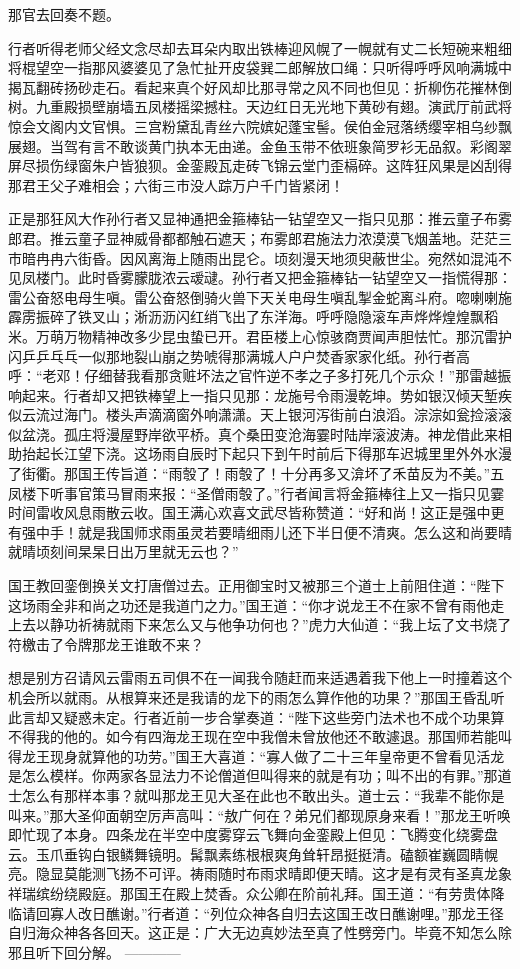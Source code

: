 \documentclass[12pt,UTF8]{ctexbook}
\begin{document}
那官去回奏不题。

行者听得老师父经文念尽却去耳朵内取出铁棒迎风幌了一幌就有丈二长短碗来粗细将棍望空一指那风婆婆见了急忙扯开皮袋巽二郎解放口绳：只听得呼呼风响满城中揭瓦翻砖扬砂走石。看起来真个好风却比那寻常之风不同也但见：折柳伤花摧林倒树。九重殿损壁崩墙五凤楼摇梁撼柱。天边红日无光地下黄砂有翅。演武厅前武将惊会文阁内文官惧。三宫粉黛乱青丝六院嫔妃蓬宝髻。侯伯金冠落绣缨宰相乌纱飘展翅。当驾有言不敢谈黄门执本无由递。金鱼玉带不依班象简罗衫无品叙。彩阁翠屏尽损伤绿窗朱户皆狼狈。金銮殿瓦走砖飞锦云堂门歪槅碎。这阵狂风果是凶刮得那君王父子难相会；六街三市没人踪万户千门皆紧闭！

正是那狂风大作孙行者又显神通把金箍棒钻一钻望空又一指只见那：推云童子布雾郎君。推云童子显神威骨都都触石遮天；布雾郎君施法力浓漠漠飞烟盖地。茫茫三市暗冉冉六街昏。因风离海上随雨出昆仑。顷刻漫天地须臾蔽世尘。宛然如混沌不见凤楼门。此时昏雾朦胧浓云叆叇。孙行者又把金箍棒钻一钻望空又一指慌得那：雷公奋怒电母生嗔。雷公奋怒倒骑火兽下天关电母生嗔乱掣金蛇离斗府。唿喇喇施霹雳振碎了铁叉山；淅沥沥闪红绡飞出了东洋海。呼呼隐隐滚车声烨烨煌煌飘稻米。万萌万物精神改多少昆虫蛰已开。君臣楼上心惊骇商贾闻声胆怯忙。那沉雷护闪乒乒乓乓一似那地裂山崩之势唬得那满城人户户焚香家家化纸。孙行者高呼：“老邓！仔细替我看那贪赃坏法之官忤逆不孝之子多打死几个示众！”那雷越振响起来。行者却又把铁棒望上一指只见那：龙施号令雨漫乾坤。势如银汉倾天堑疾似云流过海门。楼头声滴滴窗外响潇潇。天上银河泻街前白浪滔。淙淙如瓮捡滚滚似盆浇。孤庄将漫屋野岸欲平桥。真个桑田变沧海霎时陆岸滚波涛。神龙借此来相助抬起长江望下浇。这场雨自辰时下起只下到午时前后下得那车迟城里里外外水漫了街衢。那国王传旨道：“雨彀了！雨彀了！十分再多又渰坏了禾苗反为不美。”五凤楼下听事官策马冒雨来报：“圣僧雨彀了。”行者闻言将金箍棒往上又一指只见霎时间雷收风息雨散云收。国王满心欢喜文武尽皆称赞道：“好和尚！这正是强中更有强中手！就是我国师求雨虽灵若要晴细雨儿还下半日便不清爽。怎么这和尚要晴就晴顷刻间杲杲日出万里就无云也？”

国王教回銮倒换关文打唐僧过去。正用御宝时又被那三个道士上前阻住道：“陛下这场雨全非和尚之功还是我道门之力。”国王道：“你才说龙王不在家不曾有雨他走上去以静功祈祷就雨下来怎么又与他争功何也？”虎力大仙道：“我上坛了文书烧了符檄击了令牌那龙王谁敢不来？

想是别方召请风云雷雨五司俱不在一闻我令随赶而来适遇着我下他上一时撞着这个机会所以就雨。从根算来还是我请的龙下的雨怎么算作他的功果？”那国王昏乱听此言却又疑惑未定。行者近前一步合掌奏道：“陛下这些旁门法术也不成个功果算不得我的他的。如今有四海龙王现在空中我僧未曾放他还不敢遽退。那国师若能叫得龙王现身就算他的功劳。”国王大喜道：“寡人做了二十三年皇帝更不曾看见活龙是怎么模样。你两家各显法力不论僧道但叫得来的就是有功；叫不出的有罪。”那道士怎么有那样本事？就叫那龙王见大圣在此也不敢出头。道士云：“我辈不能你是叫来。”那大圣仰面朝空厉声高叫：“敖广何在？弟兄们都现原身来看！”那龙王听唤即忙现了本身。四条龙在半空中度雾穿云飞舞向金銮殿上但见：飞腾变化绕雾盘云。玉爪垂钩白银鳞舞镜明。髯飘素练根根爽角耸轩昂挺挺清。磕额崔巍圆睛幌亮。隐显莫能测飞扬不可评。祷雨随时布雨求晴即便天晴。这才是有灵有圣真龙象祥瑞缤纷绕殿庭。那国王在殿上焚香。众公卿在阶前礼拜。国王道：“有劳贵体降临请回寡人改日醮谢。”行者道：“列位众神各自归去这国王改日醮谢哩。”那龙王径自归海众神各各回天。这正是：广大无边真妙法至真了性劈旁门。毕竟不知怎么除邪且听下回分解。
------------
\end{document}
